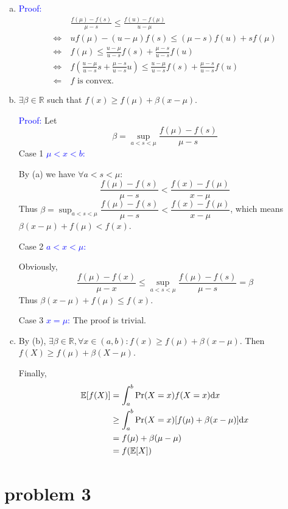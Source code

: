 \documentclass{article}
\def\RR{\mathbb{R}}
\def\EE{\mathbb{E}}
\def\Eproof{\textcolor{blue}{Proof: }}
\begin{document}
\begin{enumerate}[(a)]
	\item 
		\Eproof
		$$
		\begin{aligned}
			&
			\frac{f(\mu)-f(s)}{\mu-s}
			\le
			\frac{f(u)-f(\mu)}{u-\mu}
			\\
			\iff&
			uf(\mu)-(u-\mu)f(s)\le(\mu-s)f(u)+sf(\mu)
			\\
			\iff&
			f(\mu)
			\le
			\frac{u-\mu}{u-s}f(s)+\frac{\mu-s}{u-s}f(u)
			\\
			\iff&
			f(\frac{u-\mu}{u-s}s+\frac{\mu-s}{u-s}u)
			\le
			\frac{u-\mu}{u-s}f(s)+\frac{\mu-s}{u-s}f(u)
			\\
			\Longleftarrow\ &
			f \mbox{ is convex.}
		\end{aligned}
		$$
	\item
		$\exists \beta\in \RR$ such that $f(x)\ge f(\mu)+\beta(x-\mu)$.

		\Eproof Let 
		$$
		\beta=\sup_{a<s<\mu}\frac{f(\mu)-f(s)}{\mu-s}
		$$
		Case 1 \textcolor{blue}{$\mu<x<b$:}

		By (a) we have $\forall a<s<\mu:$
		$$
		\frac{f(\mu)-f(s)}{\mu-s}
		<
		\frac{f(x)-f(\mu)}{x-\mu}
		$$
		Thus 
		$
		\beta=\sup_{a<s<\mu}\dfrac{f(\mu)-f(s)}{\mu-s}
		<
		\dfrac{f(x)-f(\mu)}{x-\mu}
		$, which means $\beta(x-\mu)+f(\mu)<f(x)$.

		Case 2 \textcolor{blue}{$a<x<\mu$:}

		Obviously, 
		$$
		\frac{f(\mu)-f(x)}{\mu-x}
		\le
		\sup_{a<s<\mu}\frac{f(\mu)-f(s)}{\mu-s}=\beta
		$$
		Thus  $\beta(x-\mu)+f(\mu)\le f(x)$.

		Case 3 \textcolor{blue}{$x=\mu$:} The proof is trivial.

	\item
		By (b), $\exists \beta\in\RR,\forall x\in(a,b):f(x)\ge f(\mu)+\beta(x-\mu)$. Then $f(X)\ge f(\mu)+\beta(X-\mu)$.

		Finally,
		$$
		\begin{aligned}
			\EE[f(X)]
			&=
			\int_a^b\Pr(X=x)f(X=x)\dd x
			\\&\ge
			\int_a^b\Pr(X=x)\qty[f(\mu)+\beta(x-\mu)]\dd x
			\\&=
			f(\mu)+\beta(\mu-\mu)
			\\&=
			f\qty(\EE[X])
		\end{aligned}
		$$
\end{enumerate}

\section*{problem 3}
\end{document}
